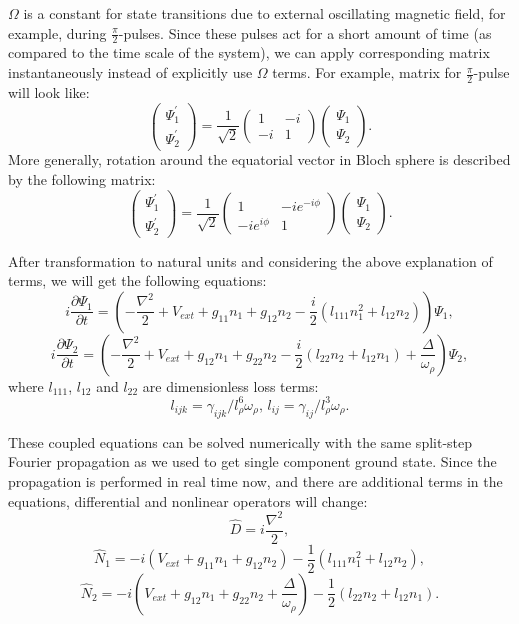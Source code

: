 \documentclass[12pt,notitlepage]{report}
\begin{document}
$\Omega$ is a constant for state transitions due to external oscillating magnetic field, for example, during $\frac{\pi}{2}$-pulses. Since these pulses act for a short amount of time (as compared to the time scale of the system), we can apply corresponding matrix instantaneously instead of explicitly use $\Omega$ terms. For example, matrix for $\frac{\pi}{2}$-pulse will look like:
\[
\begin{pmatrix}
	\Psi^\prime_1 \\	\Psi^\prime_2
\end{pmatrix} =
\frac{1}{\sqrt{2}} \begin{pmatrix}
	1 & -i \\ -i & 1
\end{pmatrix}
\begin{pmatrix}
	\Psi_1 \\ \Psi_2
\end{pmatrix}.
\]
More generally, rotation around the equatorial vector in Bloch sphere is described by the following matrix:
\[
\begin{pmatrix}
	\Psi^\prime_1 \\	\Psi^\prime_2
\end{pmatrix} =
\frac{1}{\sqrt{2}} \begin{pmatrix}
	1 & -i e^{-i \phi} \\ -i e^{i \phi} & 1
\end{pmatrix}
\begin{pmatrix}
	\Psi_1 \\ \Psi_2
\end{pmatrix}.
\]

After transformation to natural units and considering the above explanation of terms, we will get the following equations:
\[ i \frac{\partial \Psi_1}{\partial t} = \left(
	-\frac{\nabla^2}{2} + V_{ext} +
	g_{11} n_1 + g_{12} n_2 - \frac{i}{2} (l_{111} n_1^2 + l_{12} n_2)
\right) \Psi_1, \]
\[ i \frac{\partial \Psi_2}{\partial t} = \left(
	-\frac{\nabla^2}{2} + V_{ext} +
	g_{12} n_1 + g_{22} n_2 - \frac{i}{2} (l_{22} n_2 + l_{12} n_1) +
	\frac{\Delta}{\omega_\rho}
\right) \Psi_2, \]
where $l_{111}$, $l_{12}$ and $l_{22}$ are dimensionless loss terms:
\[ l_{ijk} = \gamma_{ijk} / l_\rho^6 \omega_{\rho},\, l_{ij} = \gamma_{ij} / l_\rho^3 \omega_{\rho}. \]

These coupled equations can be solved numerically with the same split-step Fourier propagation as we used to get single component ground state. Since the propagation is performed in real time now, and there are additional terms in the equations, differential and nonlinear operators will change:
\[ \hat{D} = i \frac{\nabla^2}{2}, \]
\[ \hat{N}_1 = -i \left( V_{ext} + g_{11} n_1 + g_{12} n_2 \right) - \frac{1}{2} \left( l_{111} n_1^2 + l_{12} n_2 \right), \]
\[
\hat{N}_2 = -i \left( V_{ext} + g_{12} n_1 + g_{22} n_2 + \frac{\Delta}{\omega_\rho} \right) -
\frac{1}{2} \left( l_{22} n_2 + l_{12} n_1 \right).
\]
\end{document}

